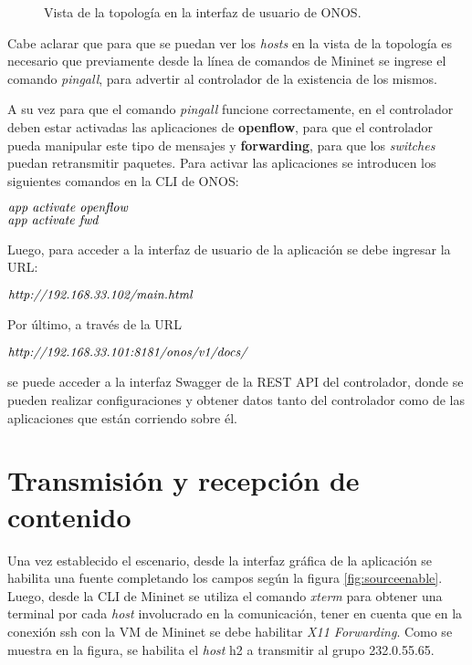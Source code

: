 \begin{figure}[th]
	\centering 
	\caption[Vista de la topología en la interfaz de usuario de ONOS]{Vista de la topología en la interfaz de usuario de ONOS.}
	\label{fig:tutorialui}
\end{figure}

Cabe aclarar que para que se puedan ver los \textit{hosts} en la vista de la topología es necesario que previamente desde la línea de comandos de Mininet se ingrese el comando \textit{pingall}, para advertir al controlador de la existencia de los mismos. 

A su vez para que el comando \textit{pingall} funcione correctamente, en el controlador deben estar activadas las aplicaciones de \textbf{openflow}, para que el controlador pueda manipular este tipo de mensajes y \textbf{forwarding}, para que los \textit{switches} puedan retransmitir paquetes. Para activar las aplicaciones se introducen los siguientes comandos en la CLI de ONOS:
\begin{center}
    $ \emph {app activate openflow}$ \\
    $ \emph {app activate fwd}$
\end{center}

Luego, para acceder a la interfaz de usuario de la aplicación se debe ingresar la URL:
\begin{center}
    $ \emph {http://192.168.33.102/main.html}$
\end{center}

Por último, a través de la URL
\begin{center}
    $ \emph {http://192.168.33.101:8181/onos/v1/docs/}$
\end{center}
se puede acceder a la interfaz Swagger de la REST API del controlador, donde se pueden realizar configuraciones y obtener datos tanto del controlador como de las aplicaciones que están corriendo sobre él. 

\section{Transmisión y recepción de contenido}
Una vez establecido el escenario, desde la interfaz gráfica de la aplicación se habilita una fuente completando los campos según la figura \ref{fig:sourceenable}. Luego, desde la CLI de Mininet se utiliza el comando \textit{xterm} para obtener una terminal por cada \textit{host} involucrado en la comunicación, tener en cuenta que en la conexión ssh con la VM de Mininet se debe habilitar \textit{X11 Forwarding}. Como se muestra en la figura, se habilita el \textit{host} h2 a transmitir al grupo 232.0.55.65.

